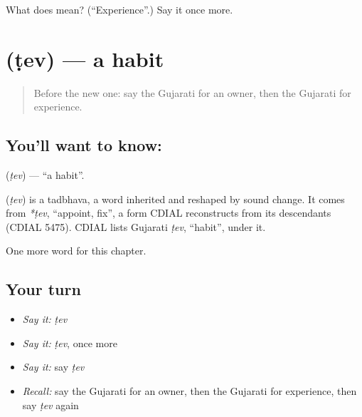 \begin{tcolorbox}[breakable,colback=teal!4,colframe=teal!35!black,title={Before you move on}]
What does  mean? (\textquotedblleft{}Experience\textquotedblright{}.) Say it once more.
\end{tcolorbox}
\section[\texorpdfstring{\gu{ટેવ} (ṭev)}{ટેવ (ṭev)}]{ (ṭev) — a habit}

\label{lesson:GU-C104-tev}



\begin{quote}
Before the new one: say the Gujarati for an owner, then the Gujarati for experience.
\end{quote}

\subsection*{You'll want to know: }
\textbf{} (\emph{ṭev}) — \textquotedblleft{}a habit\textquotedblright{}.

\begin{cousinweb}
\textbf{} (\emph{ṭev}) is a tadbhava, a word inherited and reshaped by sound change. It comes from \emph{*ṭev}, \textquotedblleft{}appoint, fix\textquotedblright{}, a form CDIAL reconstructs from its descendants (CDIAL 5475). CDIAL lists Gujarati \emph{ṭev}, \textquotedblleft{}habit\textquotedblright{}, under it.
\end{cousinweb}

\begin{grammarlens}[title={What you've built}]
One more word for this chapter.
\end{grammarlens}

\subsection*{Your turn}
\begin{itemize}
\raggedright
  \item \emph{Say it:} \emph{ṭev}
  \item \emph{Say it:} \emph{ṭev}, once more
  \item \emph{Say it:} say \emph{ṭev}
  \item \emph{Recall:} say the Gujarati for an owner, then the Gujarati for experience, then say \emph{ṭev} again
\end{itemize}

